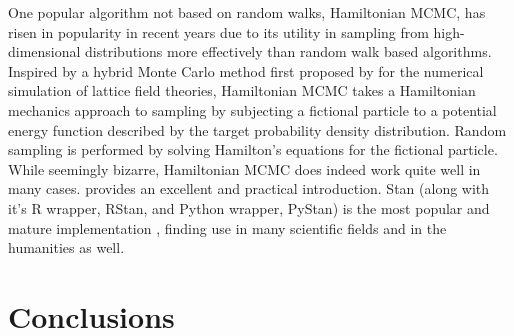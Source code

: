 One popular algorithm not based on random walks, Hamiltonian MCMC, has risen in popularity in recent years due to its utility in sampling from high-dimensional distributions more effectively than random walk based algorithms. Inspired by a hybrid Monte Carlo method first proposed by \citet{Duane87} for the numerical simulation of lattice field theories, Hamiltonian MCMC takes a Hamiltonian mechanics approach to sampling by subjecting a fictional particle to a potential energy function described by the target probability density distribution. Random sampling is performed by solving Hamilton's equations for the fictional particle. While seemingly bizarre, Hamiltonian MCMC does indeed work quite well in many cases. \citet{Neal11} provides an excellent and practical introduction. Stan (along with it's R wrapper, RStan, and Python wrapper, PyStan) is the most popular and mature implementation \citep{Carpenter17}, finding use in many scientific fields and in the humanities as well.




\section{Conclusions}
